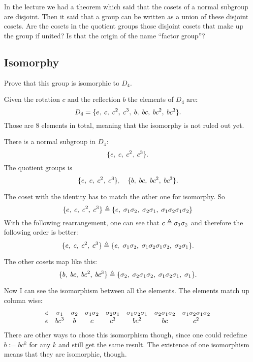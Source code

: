 \documentclass[11pt, english, fleqn, DIV=15, headinclude, BCOR=1cm]{scrartcl}
\begin{document}
\begin{question}
    In the lecture we had a theorem which said that the cosets of a normal
    subgroup are disjoint. Then it said that a group can be written as a union
    of these disjoint cosets. Are the cosets in the quotient groups those
    disjoint cosets that make up the group if united? Is that the origin of the
    name “factor group”?
\end{question}

\subsection{Isomorphy}

\begin{problem}
    Prove that this group is isomorphic to $D_4$.
\end{problem}

Given the rotation $c$ and the reflection $b$ the elements of $D_4$ are:
\[
    D_4 = \{ e,\; c,\; c^2,\; c^3,\; b,\; bc,\; bc^2,\; bc^3 \}.
\]
Those are 8 elements in total, meaning that the isomorphy is not ruled out
yet.

There is a normal subgroup in $D_4$:
\[
    \{ e,\; c,\; c^2,\; c^3 \}.
\]
The quotient groups is
\[
    \{ e,\; c,\; c^2,\; c^3 \}
    ,\quad
    \{ b,\; bc,\; bc^2,\; bc^3 \}.
\]

The coset with the identity has to match the other one for isomorphy. So
\[
    \{ e,\; c,\; c^2,\; c^3 \}
    \triangleq
    \{ e,\; \sigma_1\sigma_2,\; \sigma_2\sigma_1,\; \sigma_1\sigma_2\sigma_1\sigma_2 \}
\]
With the following rearrangement, one can see that $c \triangleq \sigma_1\sigma_2$ and
therefore the following order is better:
\[
    \{ e,\; c,\; c^2,\; c^3 \}
    \triangleq
    \{ e,\; \sigma_1\sigma_2,\; \sigma_1\sigma_2\sigma_1\sigma_2,\; \sigma_2\sigma_1 \}.
\]

The other cosets map like this:
\[
    \{ b,\; bc,\; bc^2,\; bc^3 \}
    \triangleq
    \{ \sigma_2,\; \sigma_2\sigma_1\sigma_2,\; \sigma_1\sigma_2\sigma_1,\; \sigma_1 \}.
\]

Now I can see the isomorphism between all the elements. The elements match up
column wise:
\[
    \begin{matrix}
        e & \sigma_1 & \sigma_2 & \sigma_1\sigma_2 & \sigma_2\sigma_1 & \sigma_1\sigma_2\sigma_1 & \sigma_2\sigma_1\sigma_2 & \sigma_1\sigma_2\sigma_1\sigma_2 \\
        e & bc^3 & b & c & c^3 & bc^2 & bc & c^2 \\
    \end{matrix}
\]
There are other ways to chose this isomorphism though, since one could redefine
$b := bc^k$ for any $k$ and still get the same result. The existence of one
isomorphism means that they are isomorphic, though.
\end{document}
